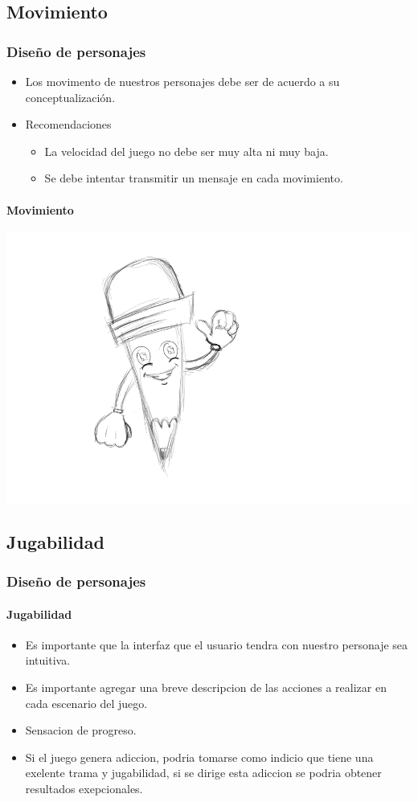 \documentclass[11pt]{beamer}
\begin{document}
\subsection{Movimiento}
\begin{frame}
\frametitle{Diseño de personajes}
\begin{itemize}
\item Los movimento de nuestros personajes debe ser de acuerdo a su conceptualización.
\item Recomendaciones
	\begin{itemize}
	\item 	La velocidad del juego no debe ser muy alta ni muy baja.
	\item 	Se debe intentar transmitir un mensaje en cada movimiento.
	
	\end{itemize}
\end{itemize}
\framesubtitle{Movimiento}
\begin{center}
 \includegraphics[scale=0.15,keepaspectratio=true]{img/lapiz.png}
\end{center}
\end{frame}

\subsection{Jugabilidad}
\begin{frame}

\frametitle{Diseño de personajes}
\framesubtitle{Jugabilidad}
	\begin{itemize}
	\item Es importante que la interfaz que el usuario tendra con nuestro personaje sea intuitiva.
	\item Es importante agregar una breve descripcion de las acciones a realizar en cada escenario del juego.
	\item Sensacion de progreso.
	\item Si el juego genera adiccion, podria tomarse como indicio que tiene una exelente trama y jugabilidad, si se dirige esta adiccion se podria obtener resultados exepcionales.
	\end{itemize}
\end{frame}
\end{document}
